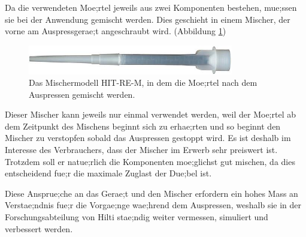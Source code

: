 Da die verwendeten Moe;rtel jeweils aus zwei Komponenten bestehen, mue;ssen sie bei der Anwendung gemischt werden. Dies geschieht in einem Mischer, der vorne am Auspressgerae;t angeschraubt wird. (Abbildung \ref{fig:Mischer})\\
%
\begin{figure}
    \centering
    \includegraphics[width=0.8\textwidth]{figures/Mischer.jpg}
    \caption{Das Mischermodell HIT-RE-M, in dem die Moe;rtel nach dem Auspressen gemischt werden.}
    \label{fig:Mischer}
\end{figure}
%
Dieser Mischer kann jeweils nur einmal verwendet werden, weil der Moe;rtel ab dem Zeitpunkt des Mischens beginnt sich zu erhae;rten und so beginnt den Mischer zu verstopfen sobald das Auspressen gestoppt wird. Es ist deshalb im Interesse des Verbrauchers, dass der Mischer im Erwerb sehr preiswert ist. Trotzdem soll er natue;rlich die Komponenten moe;glichst gut mischen, da dies entscheidend fue;r die maximale Zuglast der Due;bel ist.

Diese Ansprue;che an das Gerae;t und den Mischer erfordern ein hohes Mass an Verstae;ndnis fue;r die Vorgae;nge wae;hrend dem Auspressen, weshalb sie in der Forschungsabteilung von Hilti stae;ndig weiter vermessen, simuliert und verbessert werden.
%

